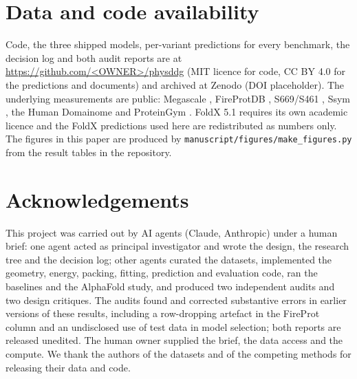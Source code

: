 \documentclass[unnumsec,webpdf,contemporary,large]{oup-authoring-template}
\begin{document}
\section{Data and code availability}

Code, the three shipped models, per-variant predictions for every benchmark, the decision log and both audit
reports are at \url{https://github.com/<OWNER>/physddg} (MIT licence for code, CC BY 4.0 for the predictions and
documents) and archived at Zenodo (DOI placeholder). The underlying measurements are public: Megascale
\citep{tsuboyama2023}, FireProtDB \citep{stourac2021}, S669/S461 \citep{pancotti2022,hernandez2023}, Ssym
\citep{pucci2018}, the Human Domainome \citep{beltran2025} and ProteinGym \citep{notin2023}. FoldX 5.1 requires
its own academic licence and the FoldX predictions used here are redistributed as numbers only. The figures in
this paper are produced by \texttt{manuscript/figures/make\_figures.py} from the result tables in the
repository.

\section{Acknowledgements}

This project was carried out by AI agents (Claude, Anthropic) under a human brief: one agent acted as principal
investigator and wrote the design, the research tree and the decision log; other agents curated the datasets,
implemented the geometry, energy, packing, fitting, prediction and evaluation code, ran the baselines and the
AlphaFold study, and produced two independent audits and two design critiques. The audits found and corrected
substantive errors in earlier versions of these results, including a row-dropping artefact in the FireProt
column and an undisclosed use of test data in model selection; both reports are released unedited. The human
owner supplied the brief, the data access and the compute. We thank the authors of the datasets and of the
competing methods for releasing their data and code.



\end{document}
